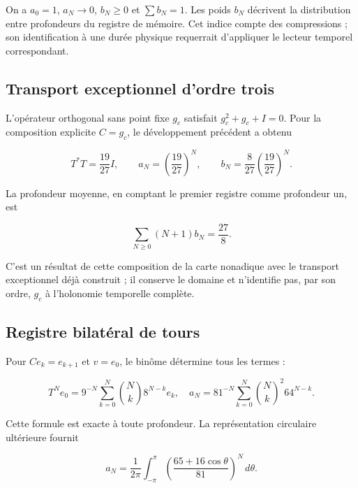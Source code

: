 On a \(a_0=1\), \(a_N\to0\), \(b_N\geq0\) et \(\sum b_N=1\). Les poids \(b_N\) décrivent la distribution entre profondeurs du registre de mémoire. Cet indice compte des compressions ; son identification à une durée physique requerrait d’appliquer le lecteur temporel correspondant.

\subsection{Transport exceptionnel d’ordre trois}

L’opérateur orthogonal sans point fixe \(g_c\) satisfait \(g_c^2+g_c+I=0\). Pour la composition explicite \(C=g_c\), le développement précédent a obtenu

\begin{equation}
T^*T=\frac{19}{27}I,
\qquad a_N=\left(\frac{19}{27}\right)^N,
\qquad b_N=\frac8{27}\left(\frac{19}{27}\right)^N.
\label{x_reciprocidad:nuc03:eq:16}
\end{equation}

La profondeur moyenne, en comptant le premier registre comme profondeur un, est

\begin{equation}
\sum_{N\geq0}(N+1)b_N=\frac{27}{8}.
\label{x_reciprocidad:nuc03:eq:17}
\end{equation}

C’est un résultat de cette composition de la carte nonadique avec le transport exceptionnel déjà construit ; il conserve le domaine et n’identifie pas, par son ordre, \(g_c\) à l’holonomie temporelle complète.


\subsection{Registre bilatéral de tours}

Pour \(C e_k=e_{k+1}\) et \(v=e_0\), le binôme détermine tous les termes :

\begin{equation}
T^Ne_0=9^{-N}\sum_{k=0}^{N}\binom{N}{k}8^{N-k}e_k,
\quad
a_N=81^{-N}\sum_{k=0}^{N}\binom{N}{k}^{\!2}64^{N-k}.
\label{x_reciprocidad:nuc03:eq:18}
\end{equation}

Cette formule est exacte à toute profondeur. La représentation circulaire ultérieure fournit

\begin{equation}
a_N=\frac1{2\pi}\int_{-\pi}^{\pi}
\left(\frac{65+16\cos\theta}{81}\right)^N\,d\theta.
\label{x_reciprocidad:nuc03:eq:19}
\end{equation}

